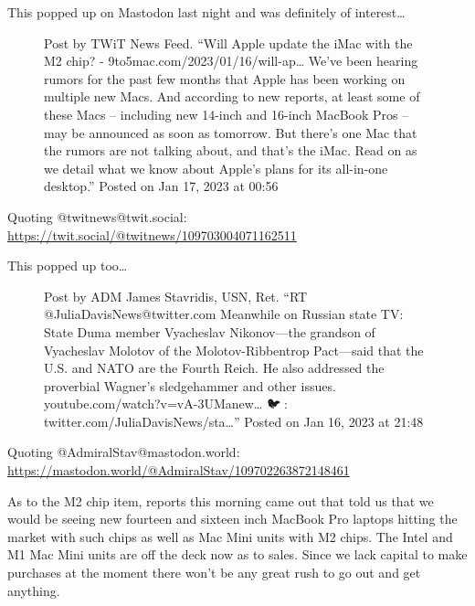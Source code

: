 This popped up on Mastodon last night and was definitely of
interest\ldots{}

\begin{figure}
\centering
{}
\caption{Post by TWiT News Feed. ``Will Apple update the iMac with the
M2 chip? - 9to5mac.com/2023/01/16/will-ap\ldots{} We've been hearing
rumors for the past few months that Apple has been working on multiple
new Macs. And according to new reports, at least some of these Macs --
including new 14-inch and 16-inch MacBook Pros -- may be announced as
soon as tomorrow. But there's one Mac that the rumors are not talking
about, and that's the iMac. Read on as we detail what we know about
Apple's plans for its all-in-one desktop.'' Posted on Jan 17, 2023 at
00:56}
\end{figure}

Quoting @twitnews@twit.social:
\url{https://twit.social/@twitnews/109703004071162511}

This popped up too\ldots{}

\begin{figure}
\centering
{}
\caption{Post by ADM James Stavridis, USN, Ret. ``RT
@JuliaDavisNews@twitter.com Meanwhile on Russian state TV: State Duma
member Vyacheslav Nikonov---the grandson of Vyacheslav Molotov of the
Molotov-Ribbentrop Pact---said that the U.S. and NATO are the Fourth
Reich. He also addressed the proverbial Wagner's sledgehammer and other
issues. youtube.com/watch?v=vA-3UManew\ldots{} 🐦🔗:
twitter.com/JuliaDavisNews/sta\ldots{}'' Posted on Jan 16, 2023 at
21:48}
\end{figure}

Quoting @AdmiralStav@mastodon.world:
\url{https://mastodon.world/@AdmiralStav/109702263872148461}

As to the M2 chip item, reports this morning came out that told us that
we would be seeing new fourteen and sixteen inch MacBook Pro laptops
hitting the market with such chips as well as Mac Mini units with M2
chips. The Intel and M1 Mac Mini units are off the deck now as to sales.
Since we lack capital to make purchases at the moment there won't be any
great rush to go out and get anything.
